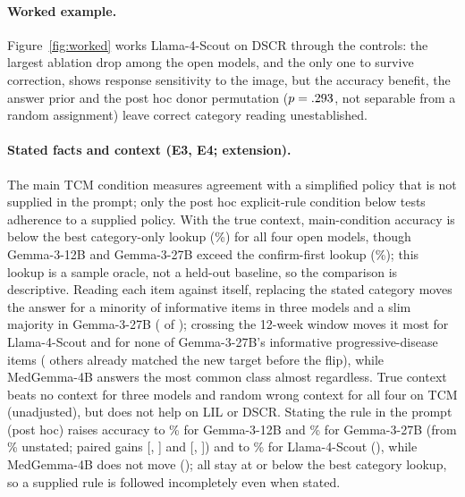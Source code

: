 \documentclass[conference]{IEEEtran}
\begin{document}
\paragraph{Worked example.} Figure~\ref{fig:worked} works Llama-4-Scout on DSCR through the controls: the largest ablation drop among the open models, and the only one to survive correction, shows response sensitivity to the image, but the accuracy benefit, the answer prior and the post hoc donor permutation ($p=.293{}$, not separable from a random assignment) leave correct category reading unestablished.

\paragraph{Stated facts and context (E3, E4; extension).} The main TCM condition measures agreement with a simplified policy that is not supplied in the prompt; only the post hoc explicit-rule condition below tests adherence to a supplied policy. With the true context, main-condition accuracy is below the best category-only lookup (\vfourTcmLookupEsc{}\%) for all four open models, though Gemma-3-12B and Gemma-3-27B exceed the confirm-first lookup (\vfourTcmLookupConf{}\%); this lookup is a sample oracle, not a held-out baseline, so the comparison is descriptive. Reading each item against itself, replacing the stated category moves the answer for a minority of informative items in three models and a slim majority in Gemma-3-27B (\vfourTransLabelMovedGemmaTwentySeven{} of \vfourTransLabelInfGemmaTwentySeven{}); crossing the 12-week window moves it most for Llama-4-Scout and for none of Gemma-3-27B's \vfourTransTimingInfGemmaTwentySeven{} informative progressive-disease items (\vfourTransTimingAlreadyGemmaTwentySeven{} others already matched the new target before the flip), while MedGemma-4B answers the most common class almost regardless. True context beats no context for three models and random wrong context for all four on TCM (unadjusted), but does not help on LIL or DSCR. Stating the rule in the prompt (post hoc) raises accuracy to \vfourExplAccGemmaTwelve{}\% for Gemma-3-12B and \vfourExplAccGemmaTwentySeven{}\% for Gemma-3-27B (from \vfourExplGoldGemmaTwelve{}\% unstated; paired gains \vfourExplDiffGemmaTwelve{} [\vfourExplLoGemmaTwelve{}, \vfourExplHiGemmaTwelve{}] and \vfourExplDiffGemmaTwentySeven{} [\vfourExplLoGemmaTwentySeven{}, \vfourExplHiGemmaTwentySeven{}]) and to \vfourExplAccScout{}\% for Llama-4-Scout (\vfourExplDiffScout{}), while MedGemma-4B does not move (\vfourExplDiffMedGemma{}); all stay at or below the best category lookup, so a supplied rule is followed incompletely even when stated.
\end{document}
